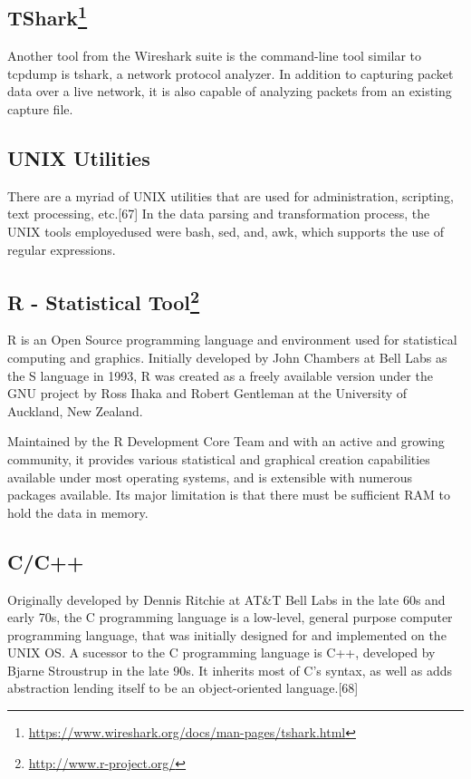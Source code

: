 \documentclass[11pt,]{article}
\let\rmarkdownfootnote\footnote%
\def\footnote{\protect\rmarkdownfootnote}
\begin{document}
\subsection[TShark]{TShark\footnote{\url{https://www.wireshark.org/docs/man-pages/tshark.html}}}\label{tshark3}

Another tool from the Wireshark suite is the command-line tool similar
to tcpdump is tshark, a network protocol analyzer. In addition to
capturing packet data over a live network, it is also capable of
analyzing packets from an existing capture file.

\subsection{UNIX Utilities}\label{unix-utilities}

There are a myriad of UNIX utilities that are used for administration,
scripting, text processing, etc.{[}67{]} In the data parsing and
transformation process, the UNIX tools employedused were bash, sed, and,
awk, which supports the use of regular expressions.

\subsection[R - Statistical Tool]{R - Statistical Tool\footnote{\url{http://www.r-project.org/}}}\label{r---statistical-tool4}

R is an Open Source programming language and environment used for
statistical computing and graphics. Initially developed by John Chambers
at Bell Labs as the S language in 1993, R was created as a freely
available version under the GNU project by Ross Ihaka and Robert
Gentleman at the University of Auckland, New Zealand.

Maintained by the R Development Core Team and with an active and growing
community, it provides various statistical and graphical creation
capabilities available under most operating systems, and is extensible
with numerous packages available. Its major limitation is that there
must be sufficient RAM to hold the data in memory.

\subsection{C/C++}\label{cc}

Originally developed by Dennis Ritchie at AT\&T Bell Labs in the late
60s and early 70s, the C programming language is a low-level, general
purpose computer programming language, that was initially designed for
and implemented on the UNIX OS. A sucessor to the C programming language
is C++, developed by Bjarne Stroustrup in the late 90s. It inherits most
of C's syntax, as well as adds abstraction lending itself to be an
object-oriented language.{[}68{]}
\end{document}
